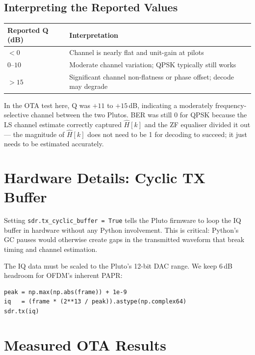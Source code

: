 \documentclass[11pt,a4paper]{article}
\begin{document}
\subsection{Interpreting the Reported Values}

\begin{center}
\begin{tabular}{ll}
\toprule
\textbf{Reported Q (dB)} & \textbf{Interpretation} \\
\midrule
$< 0$ & Channel is nearly flat and unit-gain at pilots \\
$0$--$10$ & Moderate channel variation; QPSK typically still works \\
$> 15$ & Significant channel non-flatness or phase offset; decode may degrade \\
\bottomrule
\end{tabular}
\end{center}

In the OTA test here, Q was $+11$ to $+15$\,dB, indicating a moderately
frequency-selective channel between the two Plutos.  BER was still 0 for QPSK
because the LS channel estimate correctly captured $\hat{H}[k]$ and the ZF
equaliser divided it out --- the magnitude of $\hat{H}[k]$ does not need to be 1
for decoding to succeed; it just needs to be estimated accurately.

\section{Hardware Details: Cyclic TX Buffer}

Setting \texttt{sdr.tx\_cyclic\_buffer = True} tells the Pluto firmware to
loop the IQ buffer in hardware without any Python involvement.  This is
critical: Python's GC pauses would otherwise create gaps in the transmitted
waveform that break timing and channel estimation.

The IQ data must be scaled to the Pluto's 12-bit DAC range.  We keep 6\,dB
headroom for OFDM's inherent PAPR:
\begin{lstlisting}
peak = np.max(np.abs(frame)) + 1e-9
iq   = (frame * (2**13 / peak)).astype(np.complex64)
sdr.tx(iq)
\end{lstlisting}

\section{Measured OTA Results}
\end{document}
